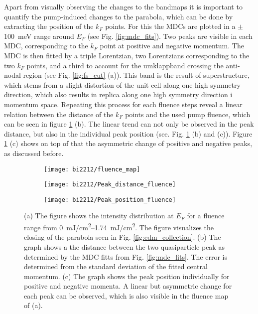 Apart from visually observing the changes to the bandmaps it is important to quantify the pump-induced changes to the parabola, which can be done by extracting the position of the $k_F$ points.
For this the MDCs are plotted in a $\pm$\qty{100}{\milli\electronvolt} range around $E_F$ (see Fig. \ref{fig:mdc_fits}).
Two peaks are visible in each MDC, corresponding to the $k_F$ point at positive and negative momentum.
The MDC is then fitted by a triple Lorentzian, two Lorentzians corresponding to the two $k_F$ points, and a third to account for the umklappband crossing the anti-nodal region (see Fig. \ref{fig:fs_cut} (a)).
This band is the result of superstructure, which stems from a slight distortion of the unit cell along one high symmetry direction, which also results in replica along one high symmetry direction i momentum space.
Repeating this process for each fluence steps reveal a linear relation between the distance of the $k_F$ points and the used pump fluence, which can be seen in figure \ref{fig:fluence_map} (b).
The linear trend can not only be observed in the peak distance, but also in the individual peak position (see. Fig. \ref{fig:fluence_map} (b) and (c)).
Figure \ref{fig:fluence_map} (c) shows on top of that the asymmetric change of positive and negative peaks, as discussed before.

\begin{figure}[t]
	\centering
	\begin{subfigure}[b]{0.25\textwidth}
		\texttt{[image: bi2212/fluence\_map]}
		\caption{}
	\end{subfigure}
	\begin{subfigure}[b]{0.35\textwidth}
		\texttt{[image: bi2212/Peak\_distance\_fluence]}
		\caption{}
	\end{subfigure}
	\begin{subfigure}[b]{0.35\textwidth}
		\texttt{[image: bi2212/Peak\_position\_fluence]}
		\caption{}
	\end{subfigure}
	\caption{(a) The figure shows the intensity distribution at $E_F$ for a fluence range from \qtyrange{0}{1.74}{\milli\joule/\centi\meter\squared}. The figure visualizes the closing of the parabola seen in Fig. \ref{fig:edm_collection}. (b) The graph shows a the distance between the two quasiparticle peak as determined by the MDC fitts from Fig. \ref{fig:mdc_fits}. The error is determined from the standard deviation of the fitted central momentum. (c) The graph shows the peak position individually for positive and negative momenta. A linear but asymmetric change for each peak can be observed, which is also visible in the fluence map of (a).}
	\label{fig:fluence_map}
\end{figure}

